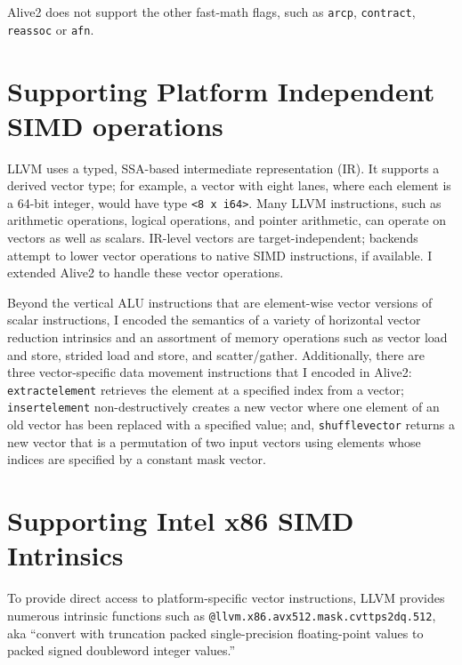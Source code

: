 Alive2 does not support the other fast-math flags, such as \texttt{arcp},
\texttt{contract}, \texttt{reassoc} or \texttt{afn}.

\section{Supporting Platform Independent SIMD operations}

LLVM uses a typed, SSA-based intermediate representation (IR).
%
It supports a derived vector type; for example, a vector with
eight lanes, where each element is a 64-bit integer, would have type
\texttt{<8 x i64>}.
%
Many LLVM instructions, such as arithmetic operations, logical operations,
and pointer arithmetic, can operate on vectors as well as scalars.
%
IR-level vectors are target-independent; backends attempt to lower
vector operations to native SIMD instructions, if available.
I extended Alive2 to handle these vector operations.


Beyond the vertical ALU instructions that are element-wise vector
versions of scalar instructions, I encoded the semantics of a
variety of horizontal vector reduction intrinsics and an assortment of
memory operations such as vector load and store, strided load and
store, and scatter/gather.
%
Additionally, there are three vector-specific data movement
instructions that I encoded in Alive2:
%
\texttt{extractelement} retrieves the element at a specified index
from a vector;
%
\texttt{insertelement} non-destructively creates a new vector where
one element of an old vector has been replaced with a specified value;
%
and, \texttt{shufflevector} returns a new vector that is a permutation
of two input vectors using elements whose indices are specified by a
constant mask vector.


\section{Supporting Intel x86 SIMD Intrinsics}

To provide direct access to platform-specific vector
instructions, LLVM provides numerous intrinsic functions such as
\texttt{@llvm.x86.avx512.mask.cvttps2dq.512}, aka ``convert with
truncation packed single-precision floating-point values to packed
signed doubleword integer values.''


